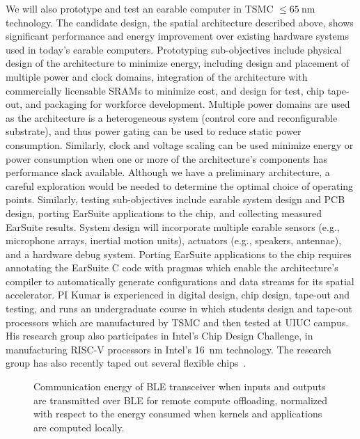 We will also prototype and test an earable computer in TSMC \(\leq
    \SI{65}{\nano\meter}\) technology.
    The candidate design, the spatial architecture described above, shows
    significant performance and energy improvement over existing hardware
    systems used in today's earable computers.
    Prototyping sub-objectives include physical design of the architecture to minimize energy, including
        design and placement of multiple power and clock domains, integration
        of the architecture with commercially licensable SRAMs to minimize cost, and design
        for test, chip tape-out, and packaging for workforce development.  Multiple power domains are
        used as the architecture is a heterogeneous system (control core and reconfigurable substrate), and thus power gating can be
        used to reduce static power consumption. Similarly, clock and voltage
        scaling can be used minimize energy or power consumption when one or
        more of the architecture's components has performance slack available.  
        Although we have a preliminary architecture,
        a careful exploration would be needed to determine the optimal choice of operating points.   Similarly, testing sub-objectives include earable system design
        and PCB design, porting EarSuite applications to the chip, and collecting
        measured EarSuite results.  System design will incorporate multiple
        earable sensors (e.g., microphone arrays, inertial motion units),
        actuators (e.g., speakers, antennae), and a hardware debug system.
        Porting EarSuite applications to the chip requires annotating the EarSuite
        C code with pragmas which enable the architecture's compiler to automatically
        generate configurations and data streams for its spatial accelerator.
        PI Kumar is experienced in digital design, chip design,
        tape-out and testing, and runs an undergraduate course in which
        students design and tape-out processors which are manufactured by TSMC
        and then tested at UIUC campus.  His research group also participates
        in Intel's Chip Design Challenge, in manufacturing RISC-V processors in
        Intel's \SI{16}{\nano\meter} technology. The research group has also recently taped out several flexible chips~\cite{}.


\begin{figure}[htbp]
  \centering
    \subfloat{
        {}
        }
    \subfloat{
        {}
    }
    \caption{ Communication energy of BLE transceiver when inputs and outputs
    are transmitted over BLE for remote compute offloading, normalized with
    respect to the energy consumed when kernels and applications are
    computed locally.}
  \label{fig:ble}
\end{figure}

